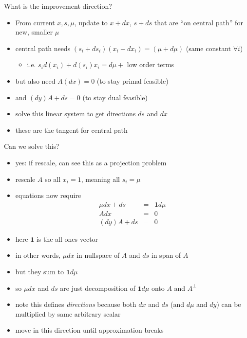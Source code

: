 \documentclass{article}
\begin{document}
What is the improvement direction?
\begin{itemize}
\item From current $x,s, \mu$, update to $x+dx$, $s+ds$ that are ``on central
 path'' for new, smaller $\mu$
\item central path needs $(s_i+ds_i)(x_i+dx_i) = (\mu+d\mu)$ (same constant $\forall i$)
\begin{itemize}
\item i.e. $s_i d(x_i) + d(s_i)x_i = d\mu +$ low order terms
\end{itemize}
\item but also need $A(dx)=0$ (to stay primal feasible)
\item and $(dy)A+ds=0$ (to stay dual feasible)
\item solve this linear system to get directions $ds$ and $dx$
\item these are the tangent for central path
\end{itemize}

Can we solve this? 
\begin{itemize}
\item yes: if rescale, can see this as a projection problem
\item rescale $A$ so all $x_i=1$, meaning all $s_i = \mu$
\item equations now require
\begin{eqnarray*}
\mu dx + ds & = &\mathbf{1}d\mu\\
Adx &= &0\\
(dy)A+ds &= &0
\end{eqnarray*}
\item here $\mathbf{1}$ is the all-ones vector
\item in other words, $\mu dx$ in nullspace of $A$ and $ds$ in span of
 $A$
\item but they sum to $\mathbf{1}d\mu$
\item so $\mu dx$ and $ds$ are just decomposition of $\mathbf{1}d\mu$ onto $A$ and $A^{\perp}$
\item note this defines \emph{directions} because both $dx$ and $ds$ (and $d\mu$ and $dy$) can be multiplied by same arbitrary scalar
\item move in this direction until approximation breaks
\end{itemize}
\end{document}
